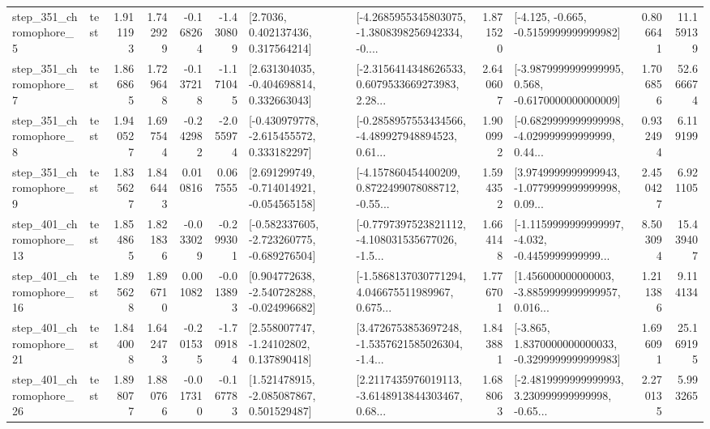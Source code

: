 \begin{tabular}{llrrrrllrlrr}
   step\_351\_chromophore\_5 &      test &      1.911193 &    1.742929 &     -0.168264 & -1.430809 &          [2.7036, 0.402137436, 0.317564214] &  [-4.2685955345803075, -1.3808398256942334, -0.... &       1.871520 &              [-4.125, -0.665, -0.5159999999999982] &            0.806641 &         11.159139 \\
   step\_351\_chromophore\_7 &      test &      1.866865 &    1.729648 &     -0.137218 & -1.171045 &    [2.631304035, -0.404698814, 0.332663043] &  [-2.3156414348626533, 0.6079533669273983, 2.28... &       2.640607 &  [-3.9879999999999995, 0.568, -0.6170000000000009] &            1.706856 &         52.666674 \\
   step\_351\_chromophore\_8 &      test &      1.940527 &    1.697544 &     -0.242982 & -2.055974 &   [-0.430979778, -2.615455572, 0.333182297] &  [-0.2858957553434566, -4.489927948894523, 0.61... &       1.900992 &  [-0.6829999999999998, -4.029999999999999, 0.44... &            0.932494 &          6.119199 \\
   step\_351\_chromophore\_9 &      test &      1.835627 &    1.846443 &      0.010816 &  0.067555 &   [2.691299749, -0.714014921, -0.054565158] &  [-4.157860454400209, 0.8722499078088712, -0.55... &       1.594352 &  [3.9749999999999943, -1.0779999999999998, 0.09... &            2.450427 &          6.921105 \\
  step\_401\_chromophore\_13 &      test &      1.854865 &    1.821836 &     -0.033029 & -0.299301 &  [-0.582337605, -2.723260775, -0.689276504] &  [-0.7797397523821112, -4.108031535677026, -1.5... &       1.664148 &  [-1.1159999999999997, -4.032, -0.4459999999999... &            8.503094 &         15.439407 \\
  step\_401\_chromophore\_16 &      test &      1.895628 &    1.896710 &      0.001082 & -0.013893 &   [0.904772638, -2.540728288, -0.024996682] &  [-1.5868137030771294, 4.046675511989967, 0.675... &       1.776701 &  [1.456000000000003, -3.8859999999999957, 0.016... &            1.211386 &          9.114134 \\
  step\_401\_chromophore\_21 &      test &      1.844008 &    1.642473 &     -0.201535 & -1.709184 &     [2.558007747, -1.24102802, 0.137890418] &  [3.4726753853697248, -1.5357621585026304, -1.4... &       1.843881 &  [-3.865, 1.8370000000000033, -0.3299999999999983] &            1.696091 &         25.169195 \\
  step\_401\_chromophore\_26 &      test &      1.898077 &    1.880766 &     -0.017310 & -0.167783 &    [1.521478915, -2.085087867, 0.501529487] &  [2.2117435976019113, -3.6148913844303467, 0.68... &       1.688063 &  [-2.4819999999999993, 3.230999999999998, -0.65... &            2.270135 &          5.993265 \\

\end{tabular}
